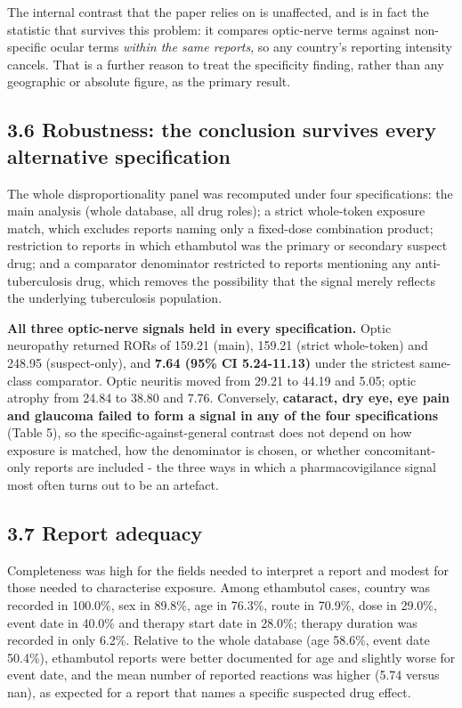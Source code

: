 \documentclass[utf8]{FrontiersinVancouver}
\begin{document}
The internal contrast that the paper relies on is unaffected, and is in fact the statistic that survives this problem: it compares optic-nerve terms against non-specific ocular terms \textit{within the same reports}, so any country's reporting intensity cancels. That is a further reason to treat the specificity finding, rather than any geographic or absolute figure, as the primary result.

\subsection{3.6 Robustness: the conclusion survives every alternative specification}

The whole disproportionality panel was recomputed under four specifications: the main analysis (whole database, all drug roles); a strict whole-token exposure match, which excludes reports naming only a fixed-dose combination product; restriction to reports in which ethambutol was the primary or secondary suspect drug; and a comparator denominator restricted to reports mentioning any anti-tuberculosis drug, which removes the possibility that the signal merely reflects the underlying tuberculosis population.

\textbf{All three optic-nerve signals held in every specification.} Optic neuropathy returned RORs of 159.21 (main), 159.21 (strict whole-token) and 248.95 (suspect-only), and \textbf{7.64 (95\% CI 5.24-11.13)} under the strictest same-class comparator. Optic neuritis moved from 29.21 to 44.19 and 5.05; optic atrophy from 24.84 to 38.80 and 7.76. Conversely, \textbf{cataract, dry eye, eye pain and glaucoma failed to form a signal in any of the four specifications} (Table 5), so the specific-against-general contrast does not depend on how exposure is matched, how the denominator is chosen, or whether concomitant-only reports are included - the three ways in which a pharmacovigilance signal most often turns out to be an artefact.

\subsection{3.7 Report adequacy}

Completeness was high for the fields needed to interpret a report and modest for those needed to characterise exposure. Among ethambutol cases, country was recorded in 100.0\%, sex in 89.8\%, age in 76.3\%, route in 70.9\%, dose in 29.0\%, event date in 40.0\% and therapy start date in 28.0\%; therapy duration was recorded in only 6.2\%. Relative to the whole database (age 58.6\%, event date 50.4\%), ethambutol reports were better documented for age and slightly worse for event date, and the mean number of reported reactions was higher (5.74 versus nan), as expected for a report that names a specific suspected drug effect.
\end{document}
